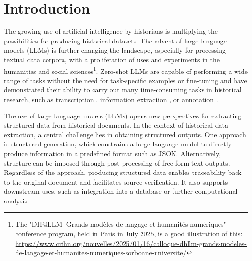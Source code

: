 \section{Introduction}
\label{sec:intro}
The growing use of artificial intelligence by historians \cite{clavert2024histoire} is multiplying the possibilities for producing historical datasets. The advent of large language models (LLMs) is further changing the landscape, especially for processing textual data corpora, with a proliferation of uses and experiments in the humanities and social sciences\footnote{The "DH@LLM: Grands modèles de langage et humanités numériques" conference program, held in Paris in July 2025, is a good illustration of this: \href{https://www.crihn.org/nouvelles/2025/01/16/colloque-dhllm-grands-modeles-de-langage-et-humanites-numeriques-sorbonne-universite/}{https://www.crihn.org/nouvelles/2025/01/16/colloque-dhllm-grands-modeles-de-langage-et-humanites-numeriques-sorbonne-universite/}}. Zero-shot LLMs are capable of performing a wide range of tasks without the need for task-specific examples or fine-tuning \cite{kojima2022large,wei2022emergent,zhao2023survey} and have demonstrated their ability to carry out many time-consuming tasks in historical research, such as transcription \cite{humphries2024unlocking}, information extraction \cite{knutsen2024alimenter}, or annotation \cite{yuan2025leveraging}. 


The use of large language models (LLMs) opens new perspectives for extracting structured data \cite{liu2024structured} from historical documents. In the context of historical data extraction, a central challenge lies in obtaining structured outputs. One approach is structured generation, which constrains a large language model to directly produce information in a predefined format such as JSON. Alternatively, structure can be imposed through post-processing of free-form text outputs. Regardless of the approach, producing structured data enables traceability back to the original document and facilitates source verification. It also supports downstream uses, such as integration into a database or further computational analysis.

